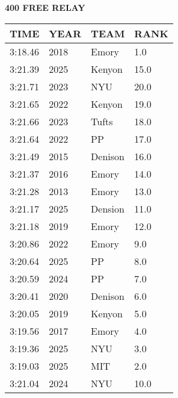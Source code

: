 \begin{center}
\begin{minipage}[t]{0.7\textwidth}
\centering
\textbf{400 FREE RELAY}\\[0.05cm]
\begin{tabular}{@{}p{1.8cm}p{1.2cm}p{1.4cm}p{0.8cm}@{}}
\hline
\textbf{TIME} & \textbf{YEAR} & \textbf{TEAM} & \textbf{RANK} \\
\hline
3:18.46 & 2018 & Emory & 1.0 \\
3:21.39 & 2025 & Kenyon & 15.0 \\
3:21.71 & 2023 & NYU & 20.0 \\
3:21.65 & 2022 & Kenyon & 19.0 \\
3:21.66 & 2023 & Tufts & 18.0 \\
3:21.64 & 2022 & PP & 17.0 \\
3:21.49 & 2015 & Denison & 16.0 \\
3:21.37 & 2016 & Emory & 14.0 \\
3:21.28 & 2013 & Emory & 13.0 \\
3:21.17 & 2025 & Dension & 11.0 \\
3:21.18 & 2019 & Emory & 12.0 \\
3:20.86 & 2022 & Emory & 9.0 \\
3:20.64 & 2025 & PP & 8.0 \\
3:20.59 & 2024 & PP & 7.0 \\
3:20.41 & 2020 & Denison & 6.0 \\
3:20.05 & 2019 & Kenyon & 5.0 \\
3:19.56 & 2017 & Emory & 4.0 \\
3:19.36 & 2025 & NYU & 3.0 \\
3:19.03 & 2025 & MIT & 2.0 \\
3:21.04 & 2024 & NYU & 10.0 \\
\hline
\end{tabular}
\end{minipage}
\end{center}

\vspace{0.4cm}

